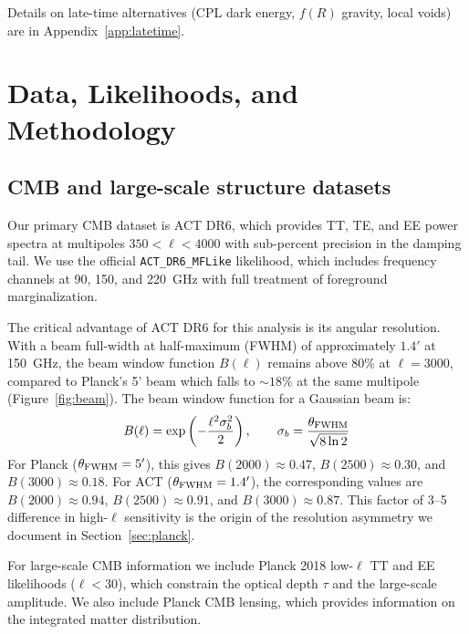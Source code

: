 \documentclass[twocolumn,showpacs,preprintnumbers,amsmath,amssymb,prd]{revtex4-2}
\begin{document}
Details on late-time alternatives (CPL dark energy, $f(R)$ gravity, local voids) 
are in Appendix~\ref{app:latetime}.

\section{Data, Likelihoods, and Methodology}
\label{sec:data}

\subsection{CMB and large-scale structure datasets}

Our primary CMB dataset is ACT DR6, which provides TT, TE, and EE power spectra 
at multipoles $350 < \ell < 4000$ with sub-percent precision in the damping tail. 
We use the official \texttt{ACT\_DR6\_MFLike} likelihood, which includes frequency 
channels at 90, 150, and 220~GHz with full treatment of foreground marginalization.

The critical advantage of ACT DR6 for this analysis is its angular resolution. 
With a beam full-width at half-maximum (FWHM) of approximately $1.4'$ at 150~GHz, 
the beam window function $B(\ell)$ remains above 80\% at $\ell = 3000$, compared 
to Planck's 5' beam which falls to $\sim 18\%$ at the same multipole (Figure~\ref{fig:beam}). 
The beam window function for a Gaussian beam is:
\begin{equation}
B(\ell) = \exp\left(-\frac{\ell^2 \sigma_b^2}{2}\right), \qquad 
\sigma_b = \frac{\theta_{\rm FWHM}}{\sqrt{8\ln 2}}
\label{eq:beam}
\end{equation}
For Planck ($\theta_{\rm FWHM} = 5'$), this gives $B(2000) \approx 0.47$, 
$B(2500) \approx 0.30$, and $B(3000) \approx 0.18$. For ACT ($\theta_{\rm FWHM} = 1.4'$), 
the corresponding values are $B(2000) \approx 0.94$, $B(2500) \approx 0.91$, 
and $B(3000) \approx 0.87$. This factor of 3--5 difference in high-$\ell$ sensitivity 
is the origin of the resolution asymmetry we document in Section~\ref{sec:planck}.

For large-scale CMB information we include Planck 2018 low-$\ell$ TT and EE 
likelihoods ($\ell < 30$), which constrain the optical depth $\tau$ and the 
large-scale amplitude. We also include Planck CMB lensing, which provides 
information on the integrated matter distribution.
\end{document}
